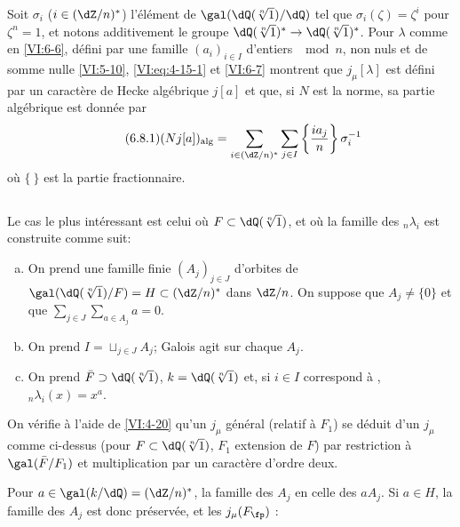 Soit $\sigma_i$ ($i\in (\dZ/n)^\ast$) l'élément de 
$\gal(\dQ(\sqrt[n]{1})/\dQ)$ tel que $\sigma_i(\zeta)=\zeta^i$ pour $\zeta^n=1$, 
et notons additivement le groupe  
$\dQ(\sqrt[n]{1})^\ast \to \dQ(\sqrt[n]{1})^\ast$. Pour $\lambda$ comme en 
\ref{VI:6-6}, défini par une famille $(a_i)_{i\in I}$ d'entiers $\mod n$, non 
nuls et de somme nulle \ref{VI:5-10}, \eqref{VI:eq:4-15-1} et \ref{VI:6-7} 
montrent que $j_\mu[\lambda]$ est défini par un caractère de Hecke 
algébrique $j[a]$ et que, si $N$ est la norme, sa partie algébrique est 
donnée par 
\begin{equation*}\tag{6.8.1}\label{VI:eq:6-8-1}
  (N j[a])_\text{alg} = \sum_{i\in (\dZ/n)^\ast} \sum_{j\in I} \left\{ \frac{i a_j}{n} \right\} \sigma_i^{-1} 
\end{equation*}
où $\{\ \}$ est la partie fractionnaire. 





\subsection{}\label{VI:6-9}

Le cas le plus intéressant est celui où $F\subset \dQ(\sqrt[n]{1})$, et 
où la famille des $_n \lambda_i$ est construite comme suit: 
\begin{enumerate}[a)]
  \item On prend une famille finie $(A_j)_{j\in J}$ d'orbites de 
    $\gal(\dQ(\sqrt[n]{1})/F)=H\subset (\dZ/n)^\ast$ dans $\dZ/n$. On suppose que 
    $A_j\ne\{0\}$ et que $\sum_{j\in J} \sum_{a\in A_j} a=0$. 
\item On prend $I=\sqcup_{j\in J} A_j$; Galois agit sur chaque $A_j$. 
  \item On prend $\bar F\supset \dQ(\sqrt[n]{1})$, $k=\dQ(\sqrt[n]{1})$ et, si 
    $i\in I$ correspond à , 
    $_n\lambda_i(x)=x^a$. 
\end{enumerate}

On vérifie à l'aide de \ref{VI:4-20} qu'un $j_\mu$ général (relatif à 
$F_1$) se déduit d'un $j_\mu$ comme ci-dessus (pour 
$F\subset \dQ(\sqrt[n]{1})$, $F_1$ extension de $F$) par restriction à 
$\gal(\bar F/F_1)$ et multiplication par un caractère d'ordre deux. 

Pour $a\in \gal(k/\dQ)=(\dZ/n)^\ast$,  la famille des $A_j$ 
en celle des $a A_j$. Si $a\in H$, la famille des $A_j$ est donc préservée, 
et les $j_\mu(F_\fp)$ : 





